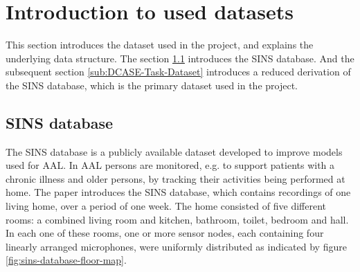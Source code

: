 \section{Introduction to used datasets}
\label{sec:Introduction-Used-Datasets}
This section introduces the dataset used in the project, and explains the underlying data structure. The section \ref{sub:SINS-Database} introduces the \gls{SINS} database. And the subsequent section \ref{sub:DCASE-Task-Dataset} introduces a reduced derivation of the \gls{SINS} database, which is the primary dataset used in the project.

\subsection{SINS database}
\label{sub:SINS-Database}
The \gls{SINS} database is a publicly available dataset developed to improve models used for \gls{AAL}. In \gls{AAL} persons are monitored, e.g. to support patients with a chronic illness and older persons, by tracking their activities being performed at home.
\newline
\newline
The paper \cite{dekkers_sins_2017} introduces the \gls{SINS} database, which contains recordings of one living home, over a period of one week. The home consisted of five different rooms: a combined living room and kitchen, bathroom, toilet, bedroom and hall. In each one of these rooms, one or more sensor nodes, each containing four linearly arranged microphones, were uniformly distributed as indicated by figure \ref{fig:sins-database-floor-map}.

